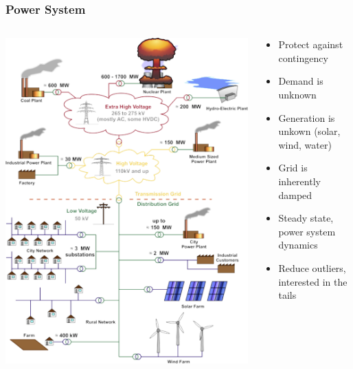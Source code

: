 \begin{frame}
  \frametitle{Power System}
  \begin{columns}
    \begin{column}{0.45\textwidth}
      \includegraphics[width=\textwidth]{figures/slides.png}
    \end{column}
    \begin{column}{0.45\textwidth}
      \begin{center}
      \end{center}
      \begin{itemize}
        \item Protect against contingency
        \item Demand is unknown
        \item Generation is unkown (solar, wind, water)
        \item Grid is inherently damped
        \item Steady state, power system dynamics
        \item Reduce outliers, interested in the tails
      \end{itemize}
    \end{column}
  \end{columns}
\end{frame}

